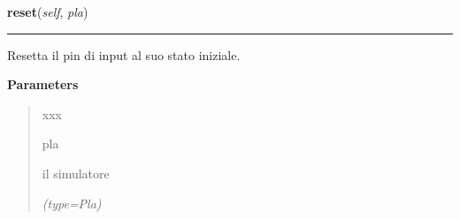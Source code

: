     \label{component:InPin:reset}

    \vspace{0.5ex}

\hspace{.8\funcindent}\begin{boxedminipage}{\funcwidth}

    \raggedright \textbf{reset}(\textit{self}, \textit{pla})

    \vspace{-1.5ex}

    \rule{\textwidth}{0.5\fboxrule}
\setlength{\parskip}{2ex}
    Resetta il pin di input al suo stato iniziale.

\setlength{\parskip}{1ex}
      \textbf{Parameters}
      \vspace{-1ex}

      \begin{quote}
        \begin{Ventry}{xxx}

          \item[pla]

          il simulatore

            {\it (type=Pla)}

        \end{Ventry}

      \end{quote}

    \end{boxedminipage}

    \label{component:InPin:wire_not}

    \vspace{0.5ex}

